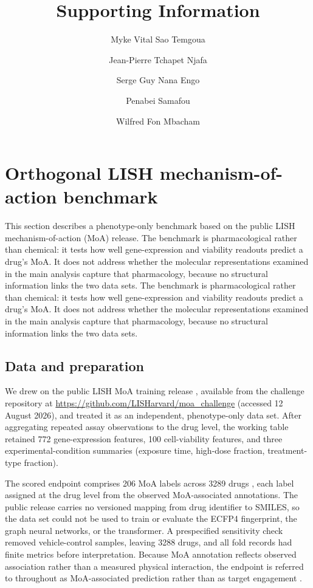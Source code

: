 \documentclass[11pt,a4paper]{article}
\title{Supporting Information}
\author{Myke Vital Sao Temgoua \and Jean-Pierre Tchapet Njafa \and Serge Guy Nana Engo \and Penabei Samafou \and Wilfred Fon Mbacham}
\date{}
\begin{document}
\maketitle

\section{Orthogonal LISH mechanism-of-action benchmark}
\label{sec:lish_si}

This section describes a phenotype-only benchmark based on the public LISH mechanism-of-action (MoA) release. The benchmark is pharmacological rather than chemical: it tests how well gene-expression and viability readouts predict a drug's MoA. It does not address whether the molecular representations examined in the main analysis capture that pharmacology, because no structural information links the two data sets. The benchmark is pharmacological rather than chemical: it tests how well gene-expression and viability readouts predict a drug's MoA. It does not address whether the molecular representations examined in the main analysis capture that pharmacology, because no structural information links the two data sets.

\subsection{Data and preparation}

We drew on the public LISH MoA training release \citep{lish_moa_2019}, available from the challenge repository at \url{https://github.com/LISHarvard/moa_challenge} (accessed 12 August 2026), and treated it as an independent, phenotype-only data set. After aggregating repeated assay observations to the drug level, the working table retained \num{772} gene-expression features, \num{100} cell-viability features, and three experimental-condition summaries (exposure time, high-dose fraction, treatment-type fraction).

The scored endpoint comprises \num{206} MoA labels across \num{3289} drugs \citep{Trapotsi2022MoA}, each label assigned at the drug level from the observed MoA-associated annotations. The public release carries no versioned mapping from drug identifier to SMILES, so the data set could not be used to train or evaluate the ECFP4 fingerprint, the graph neural networks, or the transformer. A prespecified sensitivity check removed vehicle-control samples, leaving \num{3288} drugs, and all fold records had finite metrics before interpretation. Because MoA annotation reflects observed association rather than a measured physical interaction, the endpoint is referred to throughout as MoA-associated prediction rather than as target engagement \citep{Trapotsi2022MoA}.
\end{document}
